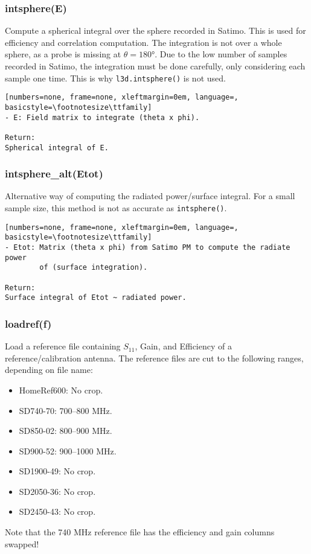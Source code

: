 \subsubsection{intsphere(E)}
Compute a spherical integral over the sphere recorded in Satimo. This is used
for efficiency and correlation computation. The integration is not over a
whole sphere, as a probe is missing at $\theta = \ang{180}$. Due to the low
number of samples recorded in Satimo, the integration must be done carefully,
only considering each sample one time. This is why \texttt{l3d.intsphere()}
is not used.

\begin{lstlisting}[numbers=none, frame=none, xleftmargin=0em, language=, basicstyle=\footnotesize\ttfamily]
- E: Field matrix to integrate (theta x phi).

Return:
Spherical integral of E.
\end{lstlisting}

\subsubsection{intsphere\_alt(Etot)}
Alternative way of computing the radiated power/surface integral. For a small
sample size, this method is not as accurate as \texttt{intsphere()}.

\begin{lstlisting}[numbers=none, frame=none, xleftmargin=0em, language=, basicstyle=\footnotesize\ttfamily]
- Etot: Matrix (theta x phi) from Satimo PM to compute the radiate power
        of (surface integration).

Return:
Surface integral of Etot ~ radiated power.
\end{lstlisting}

\subsubsection{loadref(f)}
Load a reference file containing $S_{11}$, Gain, and Efficiency of a
reference/calibration antenna.
The reference files are cut to the following ranges, depending on file name:
\begin{itemize}
\item HomeRef600: No crop.
\item SD740-70: 700--800 MHz.
\item SD850-02: 800--900 MHz.
\item SD900-52: 900--1000 MHz.
\item SD1900-49: No crop.
\item SD2050-36: No crop.
\item SD2450-43: No crop.
\end{itemize}
Note that the 740 MHz reference file has the efficiency and gain columns
swapped!

